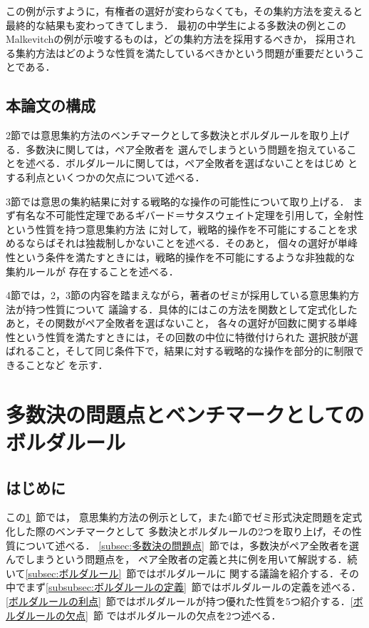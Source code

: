 \documentclass[dvipdfmx]{jsarticle}
\begin{document}
この例が示すように，有権者の選好が変わらなくても，その集約方法を変えると最終的な結果も変わってきてしまう．
最初の中学生による多数決の例とこのMalkevitchの例が示唆するものは，どの集約方法を採用するべきか，
採用される集約方法はどのような性質を満たしているべきかという問題が重要だということである．

\subsection{本論文の構成}
2節では意思集約方法のベンチマークとして多数決とボルダルールを取り上げる．多数決に関しては，ペア全敗者を
選んでしまうという問題を抱えていることを述べる．ボルダルールに関しては，ペア全敗者を選ばないことをはじめ
とする利点といくつかの欠点について述べる．

3節では意思の集約結果に対する戦略的な操作の可能性について取り上げる．
まず有名な不可能性定理であるギバード＝サタスウェイト定理を引用して，全射性という性質を持つ意思集約方法
に対して，戦略的操作を不可能にすることを求めるならばそれは独裁制しかないことを述べる．そのあと，
個々の選好が単峰性という条件を満たすときには，戦略的操作を不可能にするような非独裁的な集約ルールが
存在することを述べる．

4節では，2，3節の内容を踏まえながら，著者のゼミが採用している意思集約方法が持つ性質について
議論する．具体的にはこの方法を関数として定式化したあと，その関数がペア全敗者を選ばないこと，
各々の選好が回数に関する単峰性という性質を満たすときには，その回数の中位に特徴付けられた
選択肢が選ばれること，そして同じ条件下で，結果に対する戦略的な操作を部分的に制限できることなど
を示す．

\newpage
\section{多数決の問題点とベンチマークとしてのボルダルール}\label{sec:多数決の問題点とベンチマークとしてのボルダルール}
\subsection{はじめに}
この\ref{sec:多数決の問題点とベンチマークとしてのボルダルール}~節では，
意思集約方法の例示として，また4節でゼミ形式決定問題を定式化した際のベンチマークとして
多数決とボルダルールの2つを取り上げ，その性質について述べる．
\ref{subsec:多数決の問題点}~節では，多数決がペア全敗者を選んでしまうという問題点を，
ペア全敗者の定義と共に例を用いて解説する．続いて\ref{subsec:ボルダルール}~節ではボルダルールに
関する議論を紹介する．その中でまず\ref{subsubsec:ボルダルールの定義}~節ではボルダルールの定義を述べる．
\ref{ボルダルールの利点}~節ではボルダルールが持つ優れた性質を5つ紹介する．\ref{ボルダルールの欠点}~節
ではボルダルールの欠点を2つ述べる．
\end{document}
